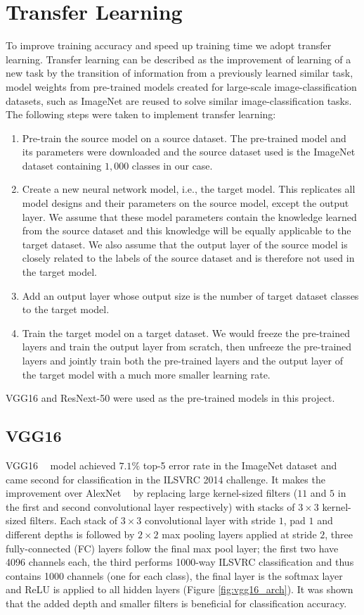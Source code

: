 \documentclass[12pt]{report}
\numberwithin{equation}{section}
\begin{document}
\section{Transfer Learning}
To improve training accuracy and speed up training time we adopt transfer learning. Transfer learning can be described as the improvement of learning of a new task by the transition of information from a previously learned similar task, model weights from pre-trained models created for large-scale image-classification datasets, such as ImageNet are reused to solve similar image-classification tasks. The following steps were taken to implement transfer learning:
\begin{enumerate}
\item Pre-train the source model on a source dataset. The pre-trained model and its parameters were downloaded and the source dataset used is the ImageNet dataset containing $1,000$ classes in our case.
\item Create a new neural network model, i.e., the target model. This replicates all model designs and their parameters on the source model, except the output layer. We assume that these model parameters contain the knowledge learned from the source dataset and this knowledge will be equally applicable to the target dataset. We also assume that the output layer of the source model is closely related to the labels of the source dataset and is therefore not used in the target model.
\item Add an output layer whose output size is the number of target dataset classes to the target model.
\item Train the target model on a target dataset. We would freeze the pre-trained layers and train the output layer from scratch, then unfreeze the pre-trained layers and jointly train both the pre-trained layers and the output layer of the target model with a much more smaller learning rate.
\end{enumerate} \noindent
VGG16 and ResNext-50 were used as the pre-trained models in this project. 

\subsection{VGG16}
VGG16 \textbf{~\cite{simonyan2015deep}} model achieved $7.1\%$ top-5 error rate in the ImageNet dataset and came second for classification in the ILSVRC 2014 challenge. It makes the improvement over AlexNet \textbf{~\cite{Krizhevsky}} by replacing large kernel-sized filters ($11$ and $5$ in the first and second convolutional layer respectively) with stacks of $3 \times 3$ kernel-sized filters. Each stack of  $3 \times 3$ convolutional layer with stride $1$, pad $1$ and different depths is followed by $2 \times 2$ max pooling layers applied at stride $2$, three fully-connected (FC) layers follow the final max pool layer; the first two have 4096 channels each, the third performs 1000-way ILSVRC classification and thus contains 1000 channels (one for each class), the final layer is the softmax layer and ReLU is applied to all hidden layers (Figure \ref{fig:vgg16_arch}). It was shown that the added depth and smaller filters is beneficial for classification accuracy.
\end{document}
